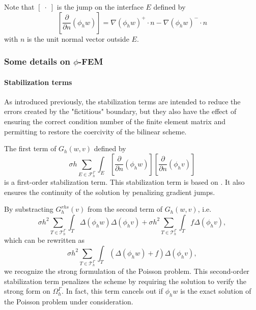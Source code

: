 \begin{Rem}
	Note that $[\;\cdot\;]$ is the jump on the interface $E$ defined by
	\begin{equation*}
		\left[\frac{\partial}{\partial n}(\phi_h w)\right]=\nabla(\phi_h w)^+\cdot n - \nabla(\phi_h w)^-\cdot n
	\end{equation*}
with $n$ is the unit normal vector outside $E$.
\end{Rem}

\subsubsection{Some details on $\phi$-FEM} \label{FEM.details}

\paragraph{Stabilization terms}    

As introduced previously, the stabilization terms are intended to reduce the errors created by the "fictitious" boundary, but they also have the effect of ensuring the correct condition number of the finite element matrix and permitting to restore the coercivity of the bilinear scheme.                                                                                      

The first term of $G_h(w,v)$ defined by
\begin{equation*}
	\sigma h\sum_{E\in\mathcal{F}_h^\Gamma} \int_E \left[\frac{\partial}{\partial n}(\phi_h w)\right] \left[\frac{\partial}{\partial n}(\phi_h v)\right]
\end{equation*}
is a first-order stabilization term. This stabilization term is based on \cite{burman_ghost_2010}. It also ensures the continuity of the solution by penalizing gradient jumps.

By substracting $G_h^{rhs}(v)$ from the second term of $G_h(w,v)$, i.e.
\begin{equation*}
	\sigma h^2\sum_{T\in\mathcal{T}_h^\Gamma} \int_{T} \Delta(\phi_h w)\Delta(\phi_h v)+\sigma h^2\sum_{T\in\mathcal{T}_h^\Gamma} \int_{T} f \Delta(\phi_h v),
\end{equation*}
which can be rewritten as
\begin{equation*}
	\sigma h^2\sum_{T\in\mathcal{T}_h^\Gamma} \int_{T} \left(\Delta(\phi_h w)+f\right)\Delta(\phi_h v),
\end{equation*}
we recognize the strong formulation of the Poisson problem. This second-order stabilization term penalizes the scheme by requiring the solution to verify the strong form on $\Omega_h^\Gamma$. In fact, this term cancels out if $\phi_h w$ is the exact solution of the Poisson problem under consideration.

